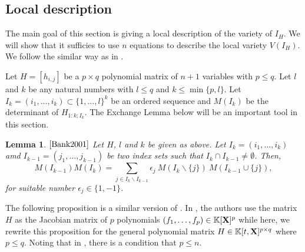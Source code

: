 \documentclass[11pt]{article}
\numberwithin{Property}{section}
\numberwithin{Theorem}{section}
\numberwithin{Proposition}{section}
\newtheorem{Lemma}{Lemma}%
\numberwithin{Lemma}{section}
\numberwithin{Corollary}{section}
\numberwithin{Definition}{section}
\numberwithin{Remark}{section}
\numberwithin{Conjecture}{section}
\numberwithin{Problem}{section}
\numberwithin{Example}{section}
\numberwithin{Claim}{section}
\renewcommand{\leq}{\leqslant}
\newcommand{\field}{\mathbb{K}} %
\newcommand{\mat}[1]{\mathbf{\MakeUppercase{#1}}} %
\begin{document}
\subsection{Local description}
\label{subsec:local}
The main goal of this section is giving a local description of the variety of $I_H$. We will show that it sufficies to use $n$ equations to describe the local variety $V(I_H)$. We follow the similar way as in \cite[Section ~ 2.2]{Bank2001}. 

Let $H = [h_{i,j}]$ be a $p \times q$ polynomial matrix of $n+1$ variables with $p \leq q$. Let $l$ and $k$ be any natural numbers with $l \leq q$ and $k \leq \min\{p,l\}$. Let $I_k = (i_1, \ldots, i_k) \subset \{1, \ldots, l\}^k$ be an ordered sequence and $M(I_k)$ be the determinant of $H_{1:k;I_k}$. The Exchange Lemma below will be an important tool in this section. 
\begin{Lemma}$\cite{Bank2001}$ Let $H$, $l$ and $k$ be given as above. Let $I_k = (i_1, \ldots, i_k)$ amd $I_{k-1} = (j_1, \ldots, j_{k-1})$ be two index sets such that $I_k \cap I_{k-1} \ne \emptyset$. Then, 
\[
M({I_{k-1}})M(I_k) = \sum_{j \in I_k \backslash I_{k-1}} \epsilon_j \ M(I_k \backslash \{j\}) \ M(I_{k-1} \cup \{j\}), 
\] for suitable number $\epsilon_j \in \{1, -1\}$. \label{exchange}
\end{Lemma}
The following proposition is a similar version of \cite[Proposition ~ 5]{Bank2001}. In \cite{Bank2001}, the authors use the matrix $H$ as the Jacobian matrix of $p$ polynomials $(f_1, \ldots, f_p) \in \field[\mat{X}]^p$ while here, we rewrite this proposition for the general polynomial matrix $H \in \field[t,\mat{X}]^{p \times q}$ where $p \leq q$. Noting that in \cite{Bank2001}, there is a condition that $p \leq n$. 
\end{document}
